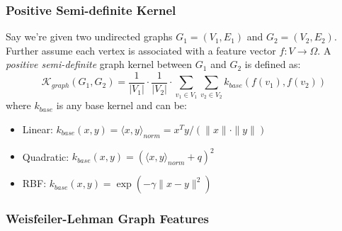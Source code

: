 \documentclass[a4paper]{article}
\begin{document}
\subsubsection{Positive Semi-definite Kernel}

Say we're given two undirected graphs $G_1 = (V_1, E_1)$ and $G_2 = (V_2, E_2)$. Further assume each vertex is associated with a feature vector $f: V \rightarrow \Omega$. A \textit{positive semi-definite} graph kernel between $G_1$ and $G_2$ is defined as:
$$\mathcal{K}_{graph}(G_1, G_2) = \frac{1}{|V_1|} \cdot \frac{1}{|V_2|} \cdot \sum\limits_{v_1 \in V_1} \sum\limits_{v_2 \in V_2} k_{base}(f(v_1), f(v_2))$$
where $k_{base}$ is any base kernel and can be:
\begin{itemize}
	\item Linear: $k_{base}(x, y) = \langle x, y \rangle_{norm} = x^Ty / (\|x\| \cdot \|y\|)$
	\item Quadratic: $k_{base}(x, y) = (\langle x, y \rangle_{norm} + q)^2$
	\item RBF: $k_{base}(x, y) = \exp(-\gamma \|x - y\|^2)$
\end{itemize}

\subsubsection{Weisfeiler-Lehman Graph Features}
\end{document}
